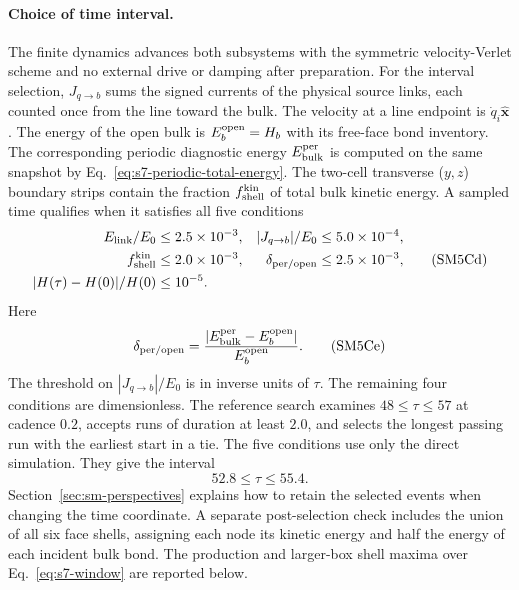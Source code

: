 \documentclass[10pt,aps,onecolumn,notitlepage,nofootinbib]{revtex4-2}
\begin{document}
\paragraph*{Choice of time interval.}
The finite dynamics advances both subsystems with the symmetric velocity-Verlet scheme and no external drive or damping after preparation. For the interval selection, $J_{q\to b}$ sums the signed currents of the physical source links, each counted once from the line toward the bulk. The velocity at a line endpoint is $\dot q_i\hat{\bm x}$. The energy of the open bulk is $E_b^{\rm open}=H_b$ with its free-face bond inventory. The corresponding periodic diagnostic energy $E_{\rm bulk}^{\rm per}$ is computed on the same snapshot by Eq.~\eqref{eq:s7-periodic-total-energy}. The two-cell transverse ($y,z$) boundary strips contain the fraction $f_{\rm shell}^{\rm kin}$ of total bulk kinetic energy. A sampled time qualifies when it satisfies all five conditions
\begin{equation*}
 \begin{aligned}
 E_{\rm link}/E_0&\le2.5\times10^{-3},&
 |J_{q\to b}|/E_0&\le5.0\times10^{-4},\\
 f_{\rm shell}^{\rm kin}&\le2.0\times10^{-3},&
 \delta_{\rm per/open}&\le2.5\times10^{-3},\\
 |H(\tau)-H(0)|/H(0)&\le10^{-5}.
 \end{aligned}
 \tag{SM5Cd}\label{eq:s7-selector-a}
\end{equation*}
Here
\begin{equation*}
 \delta_{\rm per/open}=\frac{|E_{\rm bulk}^{\rm per}-E_b^{\rm open}|}{E_b^{\rm open}}.
 \tag{SM5Ce}\label{eq:s7-selector-b}
\end{equation*}
The threshold on $|J_{q\to b}|/E_0$ is in inverse units of $\tau$. The remaining four conditions are dimensionless. The reference search examines $48\le\tau\le57$ at cadence $0.2$, accepts runs of duration at least $2.0$, and selects the longest passing run with the earliest start in a tie. The five conditions use only the direct simulation. They give the interval
\begin{equation*}
 52.8\le\tau\le55.4.
 \tag{SM5Cf}\label{eq:s7-window}
\end{equation*}
Section~\ref{sec:sm-perspectives} explains how to retain the selected events when changing the time coordinate. A separate post-selection check includes the union of all six face shells, assigning each node its kinetic energy and half the energy of each incident bulk bond. The production and larger-box shell maxima over Eq.~\eqref{eq:s7-window} are reported below.
\end{document}
